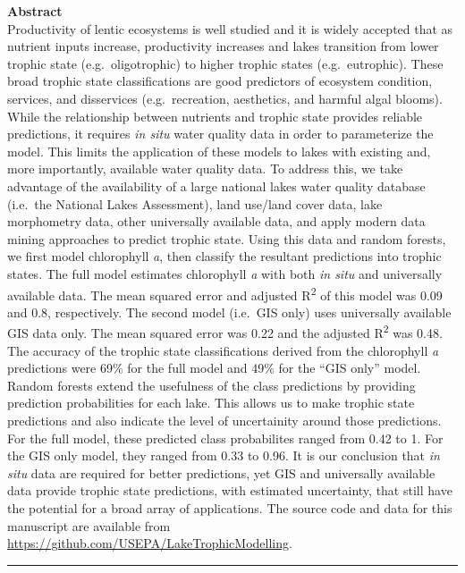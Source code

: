 \documentclass[11pt,]{article}
\begin{document}
\textbf{Abstract}\\Productivity of lentic ecosystems is well studied and
it is widely accepted that as nutrient inputs increase, productivity
increases and lakes transition from lower trophic state
(e.g.~oligotrophic) to higher trophic states (e.g.~eutrophic). These
broad trophic state classifications are good predictors of ecosystem
condition, services, and disservices (e.g.~recreation, aesthetics, and
harmful algal blooms). While the relationship between nutrients and
trophic state provides reliable predictions, it requires \emph{in situ}
water quality data in order to parameterize the model. This limits the
application of these models to lakes with existing and, more
importantly, available water quality data. To address this, we take
advantage of the availability of a large national lakes water quality
database (i.e.~the National Lakes Assessment), land use/land cover data,
lake morphometry data, other universally available data, and apply
modern data mining approaches to predict trophic state. Using this data
and random forests, we first model chlorophyll \emph{a}, then classify
the resultant predictions into trophic states. The full model estimates
chlorophyll \emph{a} with both \emph{in situ} and universally available
data. The mean squared error and adjusted R\textsuperscript{2} of this
model was 0.09 and 0.8, respectively. The second model (i.e.~GIS only)
uses universally available GIS data only. The mean squared error was
0.22 and the adjusted R\textsuperscript{2} was 0.48. The accuracy of the
trophic state classifications derived from the chlorophyll \emph{a}
predictions were 69\% for the full model and 49\% for the ``GIS only''
model. Random forests extend the usefulness of the class predictions by
providing prediction probabilities for each lake. This allows us to make
trophic state predictions and also indicate the level of uncertainity
around those predictions. For the full model, these predicted class
probabilites ranged from 0.42 to 1. For the GIS only model, they ranged
from 0.33 to 0.96. It is our conclusion that \emph{in situ} data are
required for better predictions, yet GIS and universally available data
provide trophic state predictions, with estimated uncertainty, that
still have the potential for a broad array of applications. The source
code and data for this manuscript are available from
\url{https://github.com/USEPA/LakeTrophicModelling}.

\vspace{3mm}

\hrule
\end{document}
